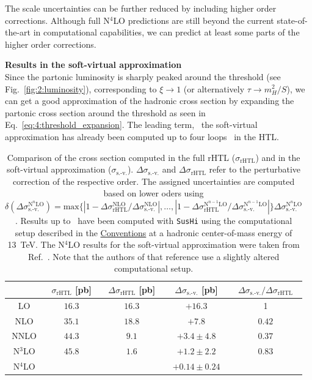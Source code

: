 The scale uncertainties can be further reduced by including higher order corrections. Although full N${}^4$LO predictions are still beyond the current state-of-the-art in computational capabilities, we can predict at least some parts of the higher order corrections.

\textbf{Results in the soft-virtual approximation}\\
Since the partonic luminosity is sharply peaked around the threshold (see Fig.~\ref{fig:2:luminosity}), corresponding to $\xi \rightarrow 1$ (or alternatively $\tau \rightarrow m_H^2/S$), we can get a good approximation of the hadronic cross section by expanding the partonic cross section around the threshold as seen in Eq.~\eqref{eq:4:threshold_expansion}. The leading term, \ie\ the soft-virtual approximation has already been computed up to four loops~\cite{Das:2020adl} in the \acs{HTL}.
\begin{table}[ht]
\centering
\begin{tabular}{ccccc}
& $\sigma_\text{rHTL}$ [pb] & $\Delta \sigma_\text{rHTL}$ [pb] & $\Delta \sigma_{\text{s.-v.}}$ [pb] & $\Delta\sigma_{\text{s.-v.}}/\Delta\sigma_\text{rHTL}$ \\
\hline
LO & $16.3$ & $16.3$ & $+16.3$ & 1 \\
NLO & $35.1$ & $18.8$ & $+7.8$ & $0.42$ \\
NNLO & $44.3$ & $9.1$ & $+3.4 \pm 4.8$ & $0.37$ \\
N${}^3$LO & $45.8$ & $1.6$ & $+1.2 \pm 2.2$ & $0.83$ \\
N${}^4$LO &  &  & $+0.14 \pm 0.24$ & \\
\end{tabular}
\caption{Comparison of the cross section computed in the full \acs{rHTL} ($\sigma_\text{rHTL}$) and in the soft-virtual approximation ($\sigma_{\text{s.-v.}}$). $\Delta \sigma_{\text{s.-v.}}$ and $\Delta \sigma_{\text{rHTL}}$ refer to the perturbative correction of the respective order. The assigned uncertainties are computed based on lower oders using $\delta(\Delta  \sigma^{\text{N}^n\text{LO}}_{\text{s.-v.}}) =  \text{max} \lbrace | 1 - \Delta \sigma^{\text{NLO}}_\text{rHTL}/ \Delta \sigma^{\text{NLO}}_{\text{s.-v.}}|,\ldots,  | 1 - \Delta \sigma^{\text{N}^{n-1}\text{LO}}_\text{rHTL}/\Delta \sigma^{\text{N}^{n-1}\text{LO}}_{\text{s.-v.}} | \rbrace \Delta  \sigma^{\text{N}^n\text{LO}}_{\text{s.-v.}}$. Results up to \NNNLO\ have been computed with \texttt{SusHi} using the computational setup described in the \hyperref[chap:notation_and_conventions]{Conventions} at a hadronic center-of-mass energy of 13~TeV. The N${}^4$LO results for the soft-virtual approximation were taken from Ref.~\cite{Das:2020adl}. Note that the authors of that reference use a slightly altered computational setup.}
\label{tab:4:soft_virtual_approximation}
\end{table}
